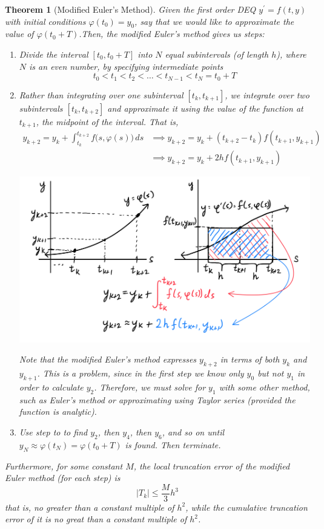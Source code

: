 \documentclass{article}
\newtheorem{theorem}{Theorem}[section]
\theoremstyle{remark}
\theoremstyle{definition}
\begin{document}
    \begin{theorem}[Modified Euler's Method]
    Given the first order DEQ $y^\prime = f(t, y)$ with initial conditions $\varphi(t_0) = y_0$, say that we would like to approximate the value of $\varphi(t_0 + T)$.Then, the \textit{modified Euler's method} gives us steps: 
    \begin{enumerate}
        \item Divide the interval $[t_0, t_0 + T]$ into $N$ equal subintervals (of length $h$), where $N$ is an even number, by specifying intermediate points
        \[t_0 < t_1 < t_2 < \ldots < t_{N-1} < t_N = t_0 + T\]
        \item Rather than integrating over one subinterval $[t_k, t_{k+1}]$, we integrate over two subintervals $[t_k, t_{k+2}]$ and approximate it using the value of the function at $t_{k+1}$, the midpoint of the interval. That is, 
        \begin{align*}
            y_{k+2} = y_k + \int_{t_k}^{t_{k+2}} f\big(s, \varphi(s)\big)\,ds & \implies y_{k+2} = y_k + (t_{k+2} - t_k) f(t_{k+1}, y_{k+1}) \\
            & \implies y_{k+2} = y_k + 2 h f(t_{k+1}, y_{k+1})
        \end{align*}
        \begin{center}
            \includegraphics[scale=0.25]{img/Modified_Euler_Method.PNG}
        \end{center}
        Note that the modified Euler's method expresses $y_{k+2}$ in terms of both $y_k$ and $y_{k+1}$. This is a problem, since in the first step we know only $y_0$ but not $y_1$ in order to calculate $y_2$. Therefore, we must solve for $y_1$ with some other method, such as Euler's method or approximating using Taylor series (provided the function is analytic). 
        \item Use step to to find $y_2$, then $y_4$, then $y_6$, and so on until $y_N \approx \varphi(t_N) = \varphi(t_0 + T)$ is found. Then terminate. 
    \end{enumerate}
    Furthermore, for some constant $M$, the local truncation error of the modified Euler method (for each step) is 
    \[|T_k| \leq \frac{M}{3} h^3\]
    that is, no greater than a constant multiple of $h^2$, while the cumulative truncation error of it is no great than a constant multiple of $h^2$. 
    \end{theorem}
\end{document}
